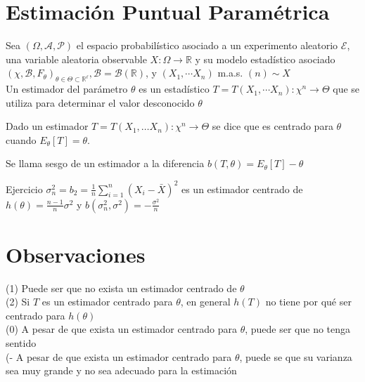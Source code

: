 \section{Estimación Puntual Paramétrica}

\begin{definición}[Estimador]
  Sea $(\Omega, \mathcal{A}, \mathcal{P})$ el espacio probabilístico asociado a un experimento aleatorio $\mathcal{E}$, una variable aleatoria observable $X: \Omega \longrightarrow \mathbb{R}$ y su modelo estadístico asociado $\left(\chi, \mathcal{B}, F_{\theta}\right)_{\theta \in \Theta \subset \mathbb{R}^{\ell}}, \mathcal{B}=\mathcal{B}(\mathbb{R})$, y $\left(X_{1}, \cdots X_{n}\right)$ m.a.s. $(n) \sim X$
  \\Un estimador del parámetro $\theta$ es un estadístico $T=T\left(X_{1}, \cdots X_{n}\right): \chi^{n} \longrightarrow \Theta$ que se utiliza para determinar el valor desconocido $\theta$
\end{definición}

\begin{definición}
  Dado un estimador $T = T(X_1, \ldots X_n): \chi^{n} \to \Theta$ se dice que es centrado para $\theta$ cuando $E_{\theta}[T] = \theta$. 
\end{definición}

\begin{definición}[Sesgo]
  Se llama sesgo de un estimador a la diferencia $b(T, \theta) = E_{\theta}[T] - \theta$
\end{definición}


\ejemplo{
  
}



Ejercicio $\sigma_{n}^{2}=b_{2}=\frac{1}{n} \sum_{i=1}^{n}\left(X_{i}-\bar{X}\right)^{2}$ es un estimador centrado de $h(\theta)=\frac{n-1}{n} \sigma^{2}$ y $b\left(\sigma_{n}^{2}, \sigma^{2}\right)=-\frac{\sigma^{2}}{n}$

\section*{Observaciones}
 (1) Puede ser que no exista un estimador centrado de $\theta$\\
(2) Si $T$ es un estimador centrado para $\theta$, en general $h(T)$ no tiene por qué ser centrado para $h(\theta)$\\
(0) A pesar de que exista un estimador centrado para $\theta$, puede ser que no tenga sentido\\
(- A pesar de que exista un estimador centrado para $\theta$, puede se que su varianza sea muy grande y no sea adecuado para la estimación

